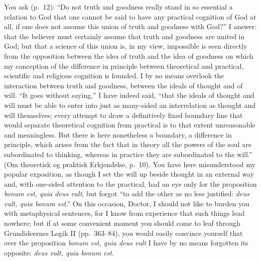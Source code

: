\documentclass[12pt,a4paper]{article}
\newcommand{\opage}[1]{\marginnote{\footnotesize\textit{[#1]}}}
\begin{document}
\opage{13}%
You ask (p.~12): ``Do not truth and goodness really stand in so
essential a relation to God that one cannot be said to have any
practical cognition of God at all, if one does not assume this union
of truth and goodness with God?''%
{} I answer: that the believer must certainly assume that truth and
goodness are united in God; but that a science of this union is, in
my view, impossible is seen directly from the opposition between the
idea of truth and the idea of goodness on which my conception of the
difference in principle between theoretical and practical, scientific
and religious cognition is founded. I by no means overlook the
interaction between truth and goodness, between the ideals of
thought and of will. ``It goes without saying,'' I have indeed said,
``that the ideals of thought and will must be able to enter into
just as many-sided an interrelation as thought and will themselves;
every attempt to draw a definitively fixed boundary line that would
separate theoretical cognition from practical is to that extent
unreasonable and meaningless. But there is here nonetheless a
boundary, a difference in principle, which arises from the fact
that in theory all the powers of the soul are subordinated to
thinking, whereas in practice they are subordinated to the will.''
(Om theoretisk og praktisk Erkjendelse, p.~10).%
{} You have here misunderstood my popular exposition, as though I set
the will up beside thought in an external way and, with one-sided
attention to the practical, had an eye only for the proposition
\textit{bonum est, quia deus vult}, but forgot ``to add the other as
no less justified: \textit{deus vult, quia bonum est}.'' On this
occasion, Doctor, I should not like to burden you with metaphysical
sentences, for I know from experience that such things lead
nowhere; but if at some convenient moment you should come to leaf
through Grundideernes Logik II (pp.~363--84), you would easily
convince yourself that over the proposition \textit{bonum est, quia
deus vult} I have by no means forgotten its opposite: \textit{deus
vult, quia bonum est}.
\end{document}
